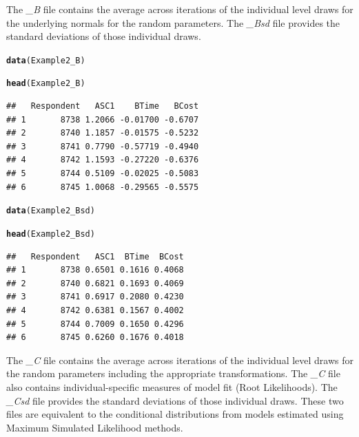 \documentclass{article}\usepackage[]{graphicx}\usepackage[]{color}
\makeatletter
\newcommand{\hlstd}[1]{\textcolor[rgb]{0.345,0.345,0.345}{#1}}%
\newcommand{\hlkwd}[1]{\textcolor[rgb]{0.737,0.353,0.396}{\textbf{#1}}}%
\newenvironment{kframe}{%
 \def\at@end@of@kframe{}%
 \ifinner\ifhmode%
  \def\at@end@of@kframe{\end{minipage}}%
  \begin{minipage}{\columnwidth}%
 \fi\fi%
 \def\FrameCommand##1{\hskip\@totalleftmargin \hskip-\fboxsep
 \colorbox{shadecolor}{##1}\hskip-\fboxsep
     \hskip-\linewidth \hskip-\@totalleftmargin \hskip\columnwidth}%
 \MakeFramed {\advance\hsize-\width
   \@totalleftmargin\z@ \linewidth\hsize
   \@setminipage}}%
 {\par\unskip\endMakeFramed%
 \at@end@of@kframe}
\newenvironment{knitrout}{}{} %
\makeatother
\begin{document}
The \emph{\_B} file contains the average across iterations of the individual level draws for the underlying normals for the random parameters. The \emph{\_Bsd} file provides the standard deviations of those individual draws.

\begin{knitrout}
\color{fgcolor}\begin{kframe}
\begin{alltt}
\hlkwd{data}\hlstd{(Example2_B)}

\hlkwd{head}\hlstd{(Example2_B)}
\end{alltt}
\begin{verbatim}
##   Respondent   ASC1    BTime   BCost
## 1       8738 1.2066 -0.01700 -0.6707
## 2       8740 1.1857 -0.01575 -0.5232
## 3       8741 0.7790 -0.57719 -0.4940
## 4       8742 1.1593 -0.27220 -0.6376
## 5       8744 0.5109 -0.02025 -0.5083
## 6       8745 1.0068 -0.29565 -0.5575
\end{verbatim}
\begin{alltt}
\hlkwd{data}\hlstd{(Example2_Bsd)}

\hlkwd{head}\hlstd{(Example2_Bsd)}
\end{alltt}
\begin{verbatim}
##   Respondent   ASC1  BTime  BCost
## 1       8738 0.6501 0.1616 0.4068
## 2       8740 0.6821 0.1693 0.4069
## 3       8741 0.6917 0.2080 0.4230
## 4       8742 0.6381 0.1567 0.4002
## 5       8744 0.7009 0.1650 0.4296
## 6       8745 0.6260 0.1676 0.4018
\end{verbatim}
\end{kframe}
\end{knitrout}


The \emph{\_C} file contains the average across iterations of the individual level draws for the random parameters including the appropriate transformations. The \emph{\_C} file also contains individual-specific measures of model fit (Root Likelihoods). The \emph{\_Csd} file provides the standard deviations of those individual draws. These two files are equivalent to the conditional distributions from models estimated using Maximum Simulated Likelihood methods.
\end{document}
